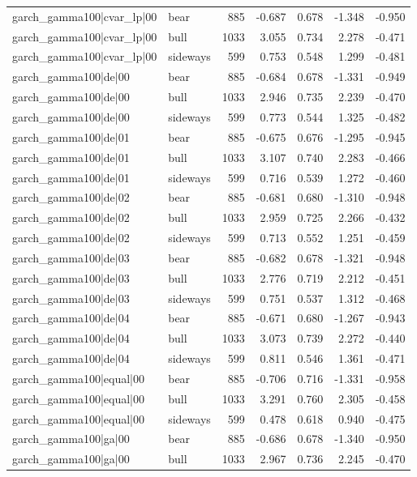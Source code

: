 \begin{table}
\begin{tabular}{llrrrrr}
garch\_gamma100|cvar\_lp|00 & bear & 885 & -0.687 & 0.678 & -1.348 & -0.950 \\
garch\_gamma100|cvar\_lp|00 & bull & 1033 & 3.055 & 0.734 & 2.278 & -0.471 \\
garch\_gamma100|cvar\_lp|00 & sideways & 599 & 0.753 & 0.548 & 1.299 & -0.481 \\
garch\_gamma100|de|00 & bear & 885 & -0.684 & 0.678 & -1.331 & -0.949 \\
garch\_gamma100|de|00 & bull & 1033 & 2.946 & 0.735 & 2.239 & -0.470 \\
garch\_gamma100|de|00 & sideways & 599 & 0.773 & 0.544 & 1.325 & -0.482 \\
garch\_gamma100|de|01 & bear & 885 & -0.675 & 0.676 & -1.295 & -0.945 \\
garch\_gamma100|de|01 & bull & 1033 & 3.107 & 0.740 & 2.283 & -0.466 \\
garch\_gamma100|de|01 & sideways & 599 & 0.716 & 0.539 & 1.272 & -0.460 \\
garch\_gamma100|de|02 & bear & 885 & -0.681 & 0.680 & -1.310 & -0.948 \\
garch\_gamma100|de|02 & bull & 1033 & 2.959 & 0.725 & 2.266 & -0.432 \\
garch\_gamma100|de|02 & sideways & 599 & 0.713 & 0.552 & 1.251 & -0.459 \\
garch\_gamma100|de|03 & bear & 885 & -0.682 & 0.678 & -1.321 & -0.948 \\
garch\_gamma100|de|03 & bull & 1033 & 2.776 & 0.719 & 2.212 & -0.451 \\
garch\_gamma100|de|03 & sideways & 599 & 0.751 & 0.537 & 1.312 & -0.468 \\
garch\_gamma100|de|04 & bear & 885 & -0.671 & 0.680 & -1.267 & -0.943 \\
garch\_gamma100|de|04 & bull & 1033 & 3.073 & 0.739 & 2.272 & -0.440 \\
garch\_gamma100|de|04 & sideways & 599 & 0.811 & 0.546 & 1.361 & -0.471 \\
garch\_gamma100|equal|00 & bear & 885 & -0.706 & 0.716 & -1.331 & -0.958 \\
garch\_gamma100|equal|00 & bull & 1033 & 3.291 & 0.760 & 2.305 & -0.458 \\
garch\_gamma100|equal|00 & sideways & 599 & 0.478 & 0.618 & 0.940 & -0.475 \\
garch\_gamma100|ga|00 & bear & 885 & -0.686 & 0.678 & -1.340 & -0.950 \\
garch\_gamma100|ga|00 & bull & 1033 & 2.967 & 0.736 & 2.245 & -0.470 \\

\end{tabular}
\end{table}
